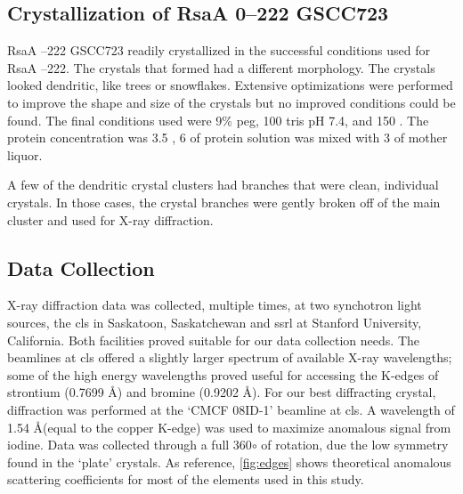 \subsection{Crystallization of RsaA \del{}0--222 GSCC723} \label{sec:cryst-rsaa-del0}

RsaA --222 GSCC723 readily crystallized in the successful conditions used for RsaA --222. The crystals that formed had a different morphology. The crystals looked dendritic, like trees or snowflakes. Extensive optimizations were performed to improve the shape and size of the crystals but no improved conditions could be found. The final conditions used were 9\% \ac{peg}, 100 \millimolar{} tris pH 7.4, and 150 \millimolar{} . The protein concentration was 3.5 \mgperml{}, 6 \microlitre{} of protein solution was mixed with 3 \microlitre{} of mother liquor. 

A few of the dendritic crystal clusters had branches that were clean, individual crystals. In those cases, the crystal branches were gently broken off of the main cluster and used for X-ray diffraction.


\subsection{Data Collection}\label{sec:crystal-data-collection}
X-ray diffraction data was collected, multiple times, at two synchotron light sources, the \ac{cls} in Saskatoon, Saskatchewan and \ac{ssrl} at Stanford University, California. Both facilities proved suitable for our data collection needs. The beamlines at \ac{cls} offered a slightly larger spectrum of available X-ray wavelengths; some of the high energy wavelengths proved useful for accessing the K-edges of strontium (0.7699 \AA) and bromine (0.9202 \AA). For our best diffracting crystal, diffraction was performed at the `CMCF 08ID-1' beamline at \ac{cls}. A wavelength of 1.54 \AA (equal to the copper K-edge) was used to maximize anomalous signal from iodine. Data was collected through a full 360$\circ$ of rotation, due the low symmetry found in the `plate' crystals. As reference, \cref{fig:edges} shows theoretical anomalous scattering coefficients for most of the elements used in this study.


